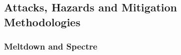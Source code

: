 %
%
%
%
%



\subsection{Attacks, Hazards and Mitigation Methodologies}
\label{sec:arch_hazards}

\subsubsection{Meltdown and Spectre}
\label{sec:arch_meltdown_spectre}

